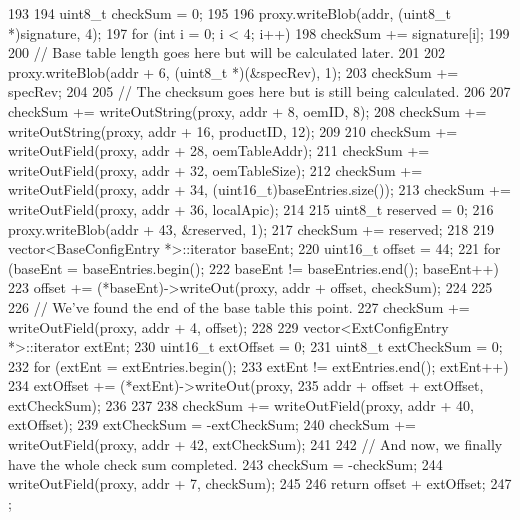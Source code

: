 \begin{DoxyCode}
193 {
194     uint8_t checkSum = 0;
195 
196     proxy.writeBlob(addr, (uint8_t *)signature, 4);
197     for (int i = 0; i < 4; i++)
198         checkSum += signature[i];
199 
200     // Base table length goes here but will be calculated later.
201 
202     proxy.writeBlob(addr + 6, (uint8_t *)(&specRev), 1);
203     checkSum += specRev;
204 
205     // The checksum goes here but is still being calculated.
206 
207     checkSum += writeOutString(proxy, addr + 8, oemID, 8);
208     checkSum += writeOutString(proxy, addr + 16, productID, 12);
209 
210     checkSum += writeOutField(proxy, addr + 28, oemTableAddr);
211     checkSum += writeOutField(proxy, addr + 32, oemTableSize);
212     checkSum += writeOutField(proxy, addr + 34, (uint16_t)baseEntries.size());
213     checkSum += writeOutField(proxy, addr + 36, localApic);
214 
215     uint8_t reserved = 0;
216     proxy.writeBlob(addr + 43, &reserved, 1);
217     checkSum += reserved;
218 
219     vector<BaseConfigEntry *>::iterator baseEnt;
220     uint16_t offset = 44;
221     for (baseEnt = baseEntries.begin();
222             baseEnt != baseEntries.end(); baseEnt++) {
223         offset += (*baseEnt)->writeOut(proxy, addr + offset, checkSum);
224     }
225 
226     // We've found the end of the base table this point.
227     checkSum += writeOutField(proxy, addr + 4, offset);
228 
229     vector<ExtConfigEntry *>::iterator extEnt;
230     uint16_t extOffset = 0;
231     uint8_t extCheckSum = 0;
232     for (extEnt = extEntries.begin();
233             extEnt != extEntries.end(); extEnt++) {
234         extOffset += (*extEnt)->writeOut(proxy,
235                 addr + offset + extOffset, extCheckSum);
236     }
237 
238     checkSum += writeOutField(proxy, addr + 40, extOffset);
239     extCheckSum = -extCheckSum;
240     checkSum += writeOutField(proxy, addr + 42, extCheckSum);
241 
242     // And now, we finally have the whole check sum completed.
243     checkSum = -checkSum;
244     writeOutField(proxy, addr + 7, checkSum);
245 
246     return offset + extOffset;
247 };
\end{DoxyCode}


